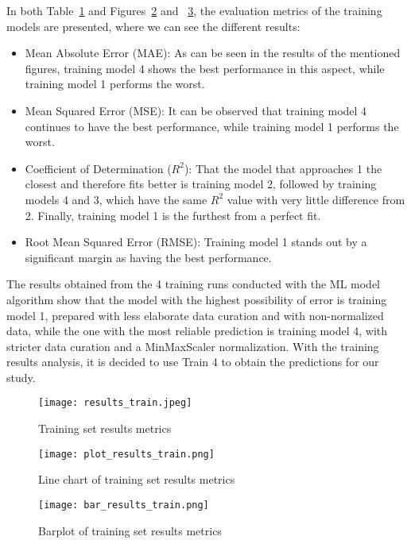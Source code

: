 \documentclass[final,times,twocolumn,article]{elsarticle}
\begin{document}
In both Table~\ref{Figure3} and Figures~\ref{Figure4} and ~\ref{Figure5}, the evaluation metrics of the training models are presented, where we can see the different results: 

\begin{itemize}
\item Mean Absolute Error (MAE): As can be seen in the results of the mentioned figures, training model 4 shows the best performance in this aspect, while training model 1 performs the worst.
\item Mean Squared Error (MSE): It can be observed that training model 4 continues to have the best performance, while training model 1 performs the worst.
\item Coefficient of Determination ($R^2$): That the model that approaches 1 the closest and therefore fits better is training model 2, followed by training models 4 and 3, which have the same $R^2$ value with very little difference from 2. Finally, training model 1 is the furthest from a perfect fit.
\item Root Mean Squared Error (RMSE): Training model 1 stands out by a significant margin as having the best performance.
\end{itemize}

The results obtained from the 4 training runs conducted with the ML model algorithm show that the model with the highest possibility of error is training model 1, prepared with less elaborate data curation and with non-normalized data, while the one with the most reliable prediction is training model 4, with stricter data curation and a MinMaxScaler normalization. With the training results analysis, it is decided to use Train 4 to obtain the predictions for our study. 

\begin{figure}[ht]
    \centering 
     \texttt{[image: results\_train.jpeg]}	
     \caption{Training set results metrics} 
     \label{Figure3}
 \end{figure}
 
 \begin{figure}[ht]
     \centering 
      \texttt{[image: plot\_results\_train.png]}	
      \caption{Line chart of training set results metrics} 
      \label{Figure4}
  \end{figure}
 
  \begin{figure}[ht]
     \centering 
      \texttt{[image: bar\_results\_train.png]}	
      \caption{Barplot of training set results metrics} 
      \label{Figure5}
  \end{figure}
\end{document}

